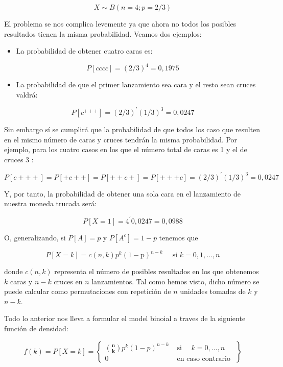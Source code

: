 \documentclass[
  a4paper,
  DIV=11,
  numbers=noendperiod]{scrreprt}
\providecommand{\tightlist}{%
  \setlength{\itemsep}{0pt}\setlength{\parskip}{0pt}}\usepackage{longtable,booktabs,array}
\begin{document}
\[
X \sim B(n=4 ; p=2 / 3)
\]

El problema se nos complica levemente ya que ahora no todos los posibles
resultados tienen la misma probabilidad. Veamos dos ejemplos:

\begin{itemize}
\tightlist
\item
  La probabilidad de obtener cuatro caras es:
\end{itemize}

\[
P[c c c c]=(2 / 3)^{4}=0,1975
\]

\begin{itemize}
\tightlist
\item
  La probabilidad de que el primer lanzamiento sea cara y el resto sean
  cruces valdrá:
\end{itemize}

\[
P\left[c^{+++}\right]=(2 / 3)^{\prime}(1 / 3)^{3}=0,0247
\]

Sin embargo sí se cumplirá que la probabilidad de que todos los caso que
resulten en el mismo número de caras y cruces tendrán la misma
probabilidad. Por ejemplo, para los cuatro casos en los que el número
total de caras es 1 y el de cruces 3 :

\[
P[c+++]=P[+c++]=P[++c+]=P[+++c]=(2 / 3)^{\prime}(1 / 3)^{3}=0,0247
\]

Y, por tanto, la probabilidad de obtener una sola cara en el lanzamiento
de nuestra moneda trucada será:

\[
P[X=1]=4^{\prime} 0,0247=0,0988
\]

O, generalizando, si \(P[A]=p\) y \(P\left[A^{c}\right]=1-p\) tenemos
que

\[
P[X=k]=c(n, k) p^{k}(1-\mathrm{p})^{n-k} \quad \text { si } k=0,1, \ldots, n
\]

donde \(c(n, k)\) representa el número de posibles resultados en los que
obtenemos \(k\) caras y \(n-k\) cruces en \(n\) lanzamientos. Tal como
hemos visto, dicho número se puede calcular como permutaciones con
repetición de \(n\) unidades tomadas de \(k\) y \(n-k\).

Todo lo anterior nos lleva a formular el model binoial a traves de la
siguiente función de densidad:

\[
f(k)=P[X=k]=\left\{\begin{array}{ll}
\binom{\mathbf{n}}{\mathbf{k}} p^{k}(1-p)^{n-k} & \text { si } \quad k=0, \ldots, n \\
0 & \text { en caso contrario }
\end{array}\right\}
\]
\end{document}
